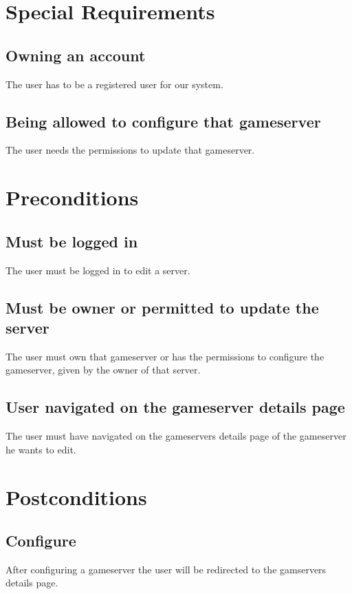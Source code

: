 \documentclass[a4paper,12pt,chapterprefix=false,bibliography=totoc,listof=totoc,]{scrreprt}
\begin{document}
\chapter{Special Requirements}

\section{Owning an account}
The user has to be a registered user for our system.

\section{Being allowed to configure that gameserver}
The user needs the permissions to update that gameserver.

\chapter{Preconditions}
\section{Must be logged in}
The user must be logged in to edit a server.

\section{Must be owner or permitted to update the server}
The user must own that gameserver or has the permissions to configure the gameserver, given by the owner of that server.

\section{User navigated on the gameserver details page}
The user must have navigated on the gameservers details page of the gameserver he wants to edit.

\chapter{Postconditions}

\section{Configure}
After configuring a gameserver the user will be redirected to the gamservers details page.
\end{document}
